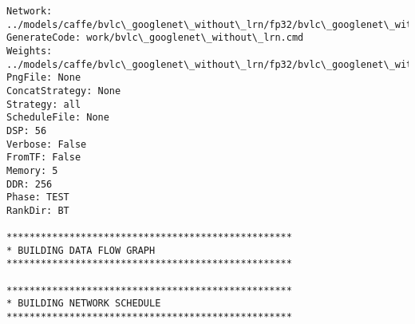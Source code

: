 \documentclass[11pt]{article}
\begin{document}
    \begin{Verbatim}[commandchars=\\\{\}]
Network: ../models/caffe/bvlc\_googlenet\_without\_lrn/fp32/bvlc\_googlenet\_without\_lrn\_deploy.prototxt
GenerateCode: work/bvlc\_googlenet\_without\_lrn.cmd
Weights: ../models/caffe/bvlc\_googlenet\_without\_lrn/fp32/bvlc\_googlenet\_without\_lrn.caffemodel
PngFile: None
ConcatStrategy: None
Strategy: all
ScheduleFile: None
DSP: 56
Verbose: False
FromTF: False
Memory: 5
DDR: 256
Phase: TEST
RankDir: BT

**************************************************
* BUILDING DATA FLOW GRAPH
**************************************************

**************************************************
* BUILDING NETWORK SCHEDULE
**************************************************

\end{Verbatim}
\end{document}
